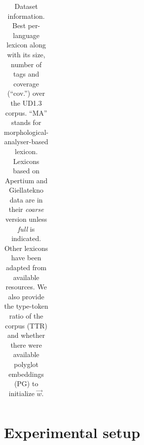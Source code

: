 \documentclass[11pt,a4paper]{article}
\begin{document}
\begin{table}[t]
\begin{tabular}{llrrr|rr}

\bottomrule
\end{tabular}
\caption{Dataset information. Best per-language lexicon along with its size, number of tags and coverage (``cov.'') over the UD1.3
  corpus. ``MA'' stands for morphological-analyser-based lexicon. Lexicons based on Apertium and Giellatekno
  data are in their {\em coarse} version unless {\em full} is indicated. Other lexicons
  have been adapted from available resources.\footnotemark{} We also provide the type-token ratio of the 
  corpus (TTR) and whether there were available polyglot embeddings (PG) to initialize $\vec{w}$.}\label{tbl:lex}
\end{table}


\section{Experimental setup}
\end{document}
